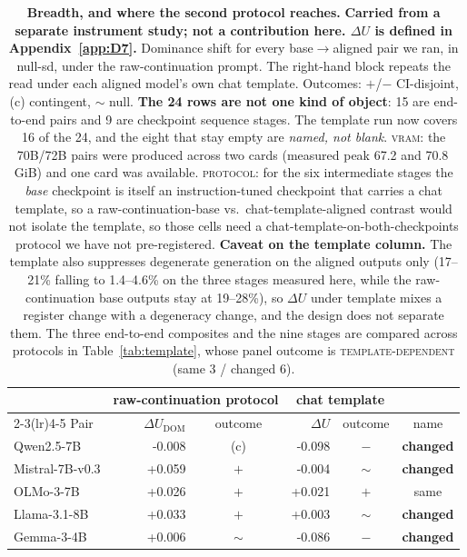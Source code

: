 \begin{table}[t]
\centering
\small
\caption{\textbf{Breadth, and where the second protocol reaches.} \textbf{Carried from a separate instrument study; not a contribution here. $\Delta U$ is defined in Appendix~\ref{app:D7}.} Dominance shift for every base$\rightarrow$aligned pair we ran, in null-sd, under the raw-continuation prompt. The right-hand block repeats the read under each aligned model's own chat template. Outcomes: $+$/$-$ CI-disjoint, (c) contingent, $\sim$ null. \textbf{The 24 rows are not one kind of object}: 15 are end-to-end pairs and 9 are checkpoint sequence stages. The template run now covers 16 of the 24, and the eight that stay empty are \emph{named, not blank}. \textsc{vram}: the 70B/72B pairs were produced across two cards (measured peak 67.2 and 70.8\,GiB) and one card was available. \textsc{protocol}: for the six intermediate stages the \emph{base} checkpoint is itself an instruction-tuned checkpoint that carries a chat template, so a raw-continuation-base vs.\ chat-template-aligned contrast would not isolate the template, so those cells need a chat-template-on-both-checkpoints protocol we have not pre-registered. \textbf{Caveat on the template column.} The template also suppresses degenerate generation on the aligned outputs only (17--21\% falling to 1.4--4.6\% on the three stages measured here, while the raw-continuation base outputs stay at 19--28\%), so $\Delta U$ under template mixes a register change with a degeneracy change, and the design does not separate them. The three end-to-end composites and the nine stages are compared across protocols in Table~\ref{tab:template}, whose panel outcome is \textsc{template-dependent} (same 3 / changed 6).}
\label{tab:breadth}
\begin{tabular}{lrcrcc}
\toprule
& \multicolumn{2}{c}{raw-continuation protocol} & \multicolumn{2}{c}{chat template} & \\
\cmidrule(lr){2-3}\cmidrule(lr){4-5}
Pair & $\Delta U_{\mathrm{DOM}}$ & outcome & $\Delta U$ & outcome & name \\
\midrule
Qwen2.5-7B & -0.008 & (c) & -0.098 & $-$ & \textbf{changed} \\
Mistral-7B-v0.3 & +0.059 & $+$ & -0.004 & $\sim$ & \textbf{changed} \\
OLMo-3-7B & +0.026 & $+$ & +0.021 & $+$ & same \\
Llama-3.1-8B & +0.033 & $+$ & +0.003 & $\sim$ & \textbf{changed} \\
Gemma-3-4B & +0.006 & $\sim$ & -0.086 & $-$ & \textbf{changed} \\

\end{tabular}
\end{table}
